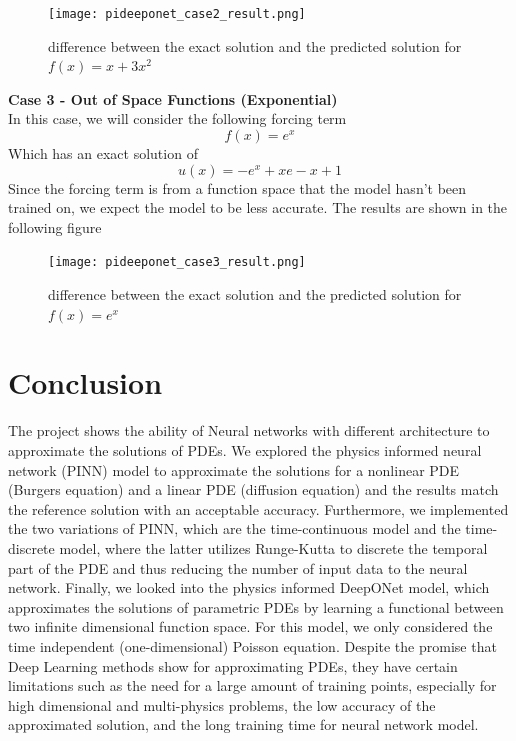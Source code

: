 \documentclass[a4paper,12pt]{article}
\theoremstyle{definition}
\begin{document}
\begin{figure}[H]
    \centering 
    \texttt{[image: pideeponet\_case2\_result.png]}
    \label{quadratic_f}
    \caption[figure2]{difference between the exact solution and the predicted solution for $f(x) = x + 3x^2$}
\end{figure}


\textbf{Case 3 - Out of Space Functions (Exponential)}\\
In this case, we will consider the following forcing term
\[f(x) = e^x\] 
Which has an exact solution of 
\[u(x) = - e^x +xe -x + 1\]
Since the forcing term is from a function space that the model hasn't been trained on, 
we expect the model to be less accurate. The results are shown in the following figure

\begin{figure}[H]
    \centering 
    \texttt{[image: pideeponet\_case3\_result.png]}
    \label{exp_f}
    \caption[figure3]{difference between the exact solution and the predicted solution for $f(x) = e^x$}
\end{figure}

\section{Conclusion}
The project shows the ability of Neural networks with different architecture
to approximate the solutions of PDEs. We explored the physics informed 
neural network (PINN) model to approximate the solutions for a nonlinear 
PDE (Burgers equation) and a linear PDE (diffusion equation) and the results 
match the reference solution with an acceptable accuracy. Furthermore, we 
implemented the two variations of PINN, which are the time-continuous model and
the time-discrete model, where the latter utilizes Runge-Kutta to discrete the 
temporal part of the PDE and thus reducing the number of input data to the neural network.
Finally, we looked into the physics informed DeepONet model, which approximates the solutions 
of parametric PDEs by learning a functional between two infinite dimensional function space. 
For this model, we only considered the time independent (one-dimensional) Poisson equation.
Despite the promise that Deep Learning methods show for approximating PDEs, they have certain 
limitations such as the need for a large amount of training points, especially for high dimensional
and multi-physics problems, the low accuracy of the approximated solution, and the long training time for 
neural network model.
\end{document}
